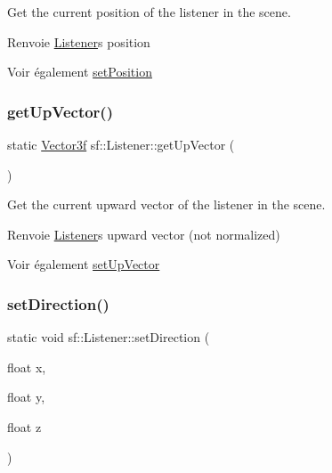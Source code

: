 Get the current position of the listener in the scene. 

\begin{DoxyReturn}{Renvoie}
\hyperlink{classsf_1_1Listener}{Listener}\textquotesingle{}s position
\end{DoxyReturn}
\begin{DoxySeeAlso}{Voir également}
\hyperlink{classsf_1_1Listener_a5bc2d8d18ea2d8f339d23cbf17678564}{set\+Position} 
\end{DoxySeeAlso}
\mbox{\label{classsf_1_1Listener_ae1427dd7e9b425b0c23b7b766bd6c6e6}} 
\subsubsection{\texorpdfstring{get\+Up\+Vector()}{getUpVector()}}
{\footnotesize\ttfamily static \hyperlink{classsf_1_1Vector3}{Vector3f} sf\+::\+Listener\+::get\+Up\+Vector (\begin{DoxyParamCaption}{ }\end{DoxyParamCaption})\hspace{0.3cm}{\ttfamily [static]}}



Get the current upward vector of the listener in the scene. 

\begin{DoxyReturn}{Renvoie}
\hyperlink{classsf_1_1Listener}{Listener}\textquotesingle{}s upward vector (not normalized)
\end{DoxyReturn}
\begin{DoxySeeAlso}{Voir également}
\hyperlink{classsf_1_1Listener_a0ea9b3083a994b2b90253543bc4e3ad6}{set\+Up\+Vector} 
\end{DoxySeeAlso}
\mbox{\label{classsf_1_1Listener_ae479dc15513c6557984d26e32d06d06e}} 
\subsubsection{\texorpdfstring{set\+Direction()}{setDirection()}\hspace{0.1cm}{\footnotesize\ttfamily [1/2]}}
{\footnotesize\ttfamily static void sf\+::\+Listener\+::set\+Direction (\begin{DoxyParamCaption}\item[{float}]{x,  }\item[{float}]{y,  }\item[{float}]{z }\end{DoxyParamCaption})\hspace{0.3cm}{\ttfamily [static]}}



